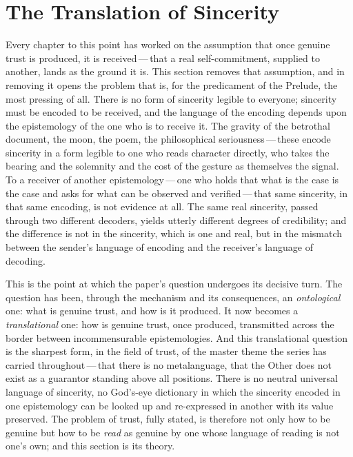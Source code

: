 \section{The Translation of Sincerity}
\label{p13:sec:translation}

\noindent
Every chapter to this point has worked on the assumption that once genuine trust is produced, it is received\,---\,that a real self-commitment, supplied to another, lands as the ground it is. This section removes that assumption, and in removing it opens the problem that is, for the predicament of the Prelude, the most pressing of all.  There is no form of sincerity legible to everyone; sincerity must be encoded to be received, and the language of the encoding depends upon the epistemology of the one who is to receive it. The gravity of the betrothal document, the moon, the poem, the philosophical seriousness\,---\,these encode sincerity in a form legible to one who reads character directly, who takes the bearing and the solemnity and the cost of the gesture as themselves the signal. To a receiver of another epistemology\,---\,one who holds that what is the case is the case and asks for what can be observed and verified\,---\,that same sincerity, in that same encoding, is not evidence at all. The same real sincerity, passed through two different decoders, yields utterly different degrees of credibility; and the difference is not in the sincerity, which is one and real, but in the mismatch between the sender's language of encoding and the receiver's language of decoding.

This is the point at which the paper's question undergoes its decisive turn. The question has been, through the mechanism and its consequences, an \emph{ontological} one: what is genuine trust, and how is it produced. It now becomes a \emph{translational} one: how is genuine trust, once produced, transmitted across the border between incommensurable epistemologies. And this translational question is the sharpest form, in the field of trust, of the master theme the series has carried throughout\,---\,that there is no metalanguage, that the Other does not exist as a guarantor standing above all positions. There is no neutral universal language of sincerity, no God's-eye dictionary in which the sincerity encoded in one epistemology can be looked up and re-expressed in another with its value preserved. The problem of trust, fully stated, is therefore not only how to be genuine but how to be \emph{read} as genuine by one whose language of reading is not one's own; and this section is its theory.


